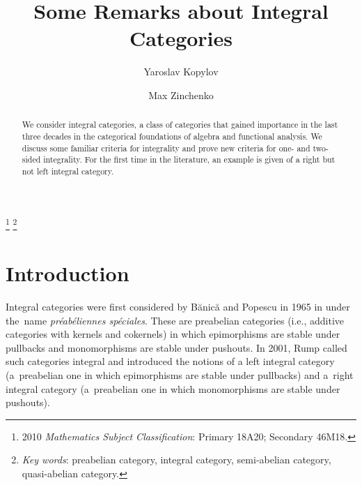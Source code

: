 \documentclass[a4paper,10pt,reqno]{amsart}
\begin{document}
	\title{Some Remarks about Integral Categories}
	\author{Yaroslav Kopylov}
	\address{Yaroslav Kopylov\,
		\newline\hphantom{iii} Sobolev Institute of Mathematics
		\newline\hphantom{iii} 4 Koptyug Ave.
		\newline\hphantom{iii} 630090, Novosibirsk, Russia}
	
	\author{Max Zinchenko}
	\address{Max Zinchenko\,
		\newline\hphantom{iii} Novosibirsk State University
		\newline\hphantom{iii} 1 Pirogova St.
		\newline\hphantom{iii} 630090, Novosibirsk, Russia}
	
	\renewcommand{\thefootnote}{}
	\footnote{2010 \emph{Mathematics Subject Classification}: Primary 18A20; Secondary 46M18.}
	\footnote{\emph{Key words}: preabelian category, integral category, semi-abelian category, quasi-abelian category.}
	\vspace{-35pt}
	
	{\small
		\begin{abstract}\noindent{}
			We consider integral categories, a class of categories that  gained importance in the last three decades in the categorical foundations of algebra and functional analysis. We discuss some familiar criteria for integrality and prove new criteria for one- and two-sided integrality. For the first time in the literature, an example is given of a right but not left integral category.
	\end{abstract}}
	
	\maketitle
	
	\section{Introduction}\label{Introduction}\vspace{-5pt}
	
	Integral categories were first considered by B\u anic\u a and Popescu in 1965 in \cite{BanicaPopescu1965} under the~name {\em pr\'eab\'eliennes sp\'eciales}. These are preabelian categories (i.e., additive categories with kernels and cokernels) in which epimorphisms are stable under pullbacks and monomorphisms are stable under pushouts. In 2001, Rump called such categories integral and introduced the notions of a left integral category (a~preabelian one in which epimorphisms are stable under pullbacks) and a~right integral category (a~preabelian one in which monomorphisms are stable under pushouts).  
	
\end{document}
